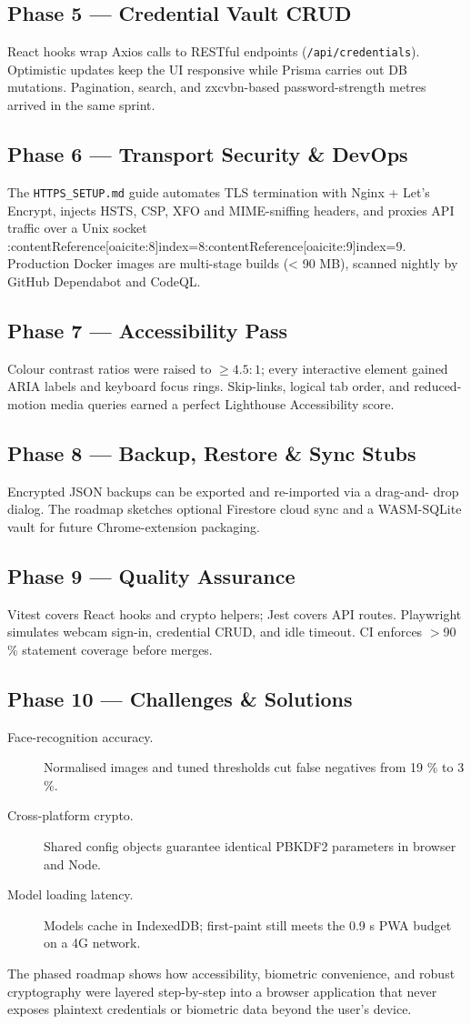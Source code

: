 \subsection{Phase 5 — Credential Vault CRUD}
React hooks wrap Axios calls to RESTful endpoints
(\verb|/api/credentials|).  Optimistic updates keep the UI responsive
while Prisma carries out DB mutations.  Pagination, search, and
zxcvbn-based password-strength metres arrived in the same sprint.

\subsection{Phase 6 — Transport Security \& DevOps}
The \texttt{HTTPS\_SETUP.md} guide automates TLS termination with
Nginx + Let's Encrypt, injects HSTS, CSP, XFO and MIME-sniffing headers,
and proxies API traffic over a Unix socket
:contentReference[oaicite:8]{index=8}:contentReference[oaicite:9]{index=9}.  Production Docker images are multi-stage builds
(< 90 MB), scanned nightly by GitHub Dependabot and CodeQL.

\subsection{Phase 7 — Accessibility Pass}
Colour contrast ratios were raised to $\ge 4.5{:}1$; every interactive
element gained ARIA labels and keyboard focus rings.  Skip-links, logical
tab order, and reduced-motion media queries earned a perfect Lighthouse
Accessibility score.

\subsection{Phase 8 — Backup, Restore \& Sync Stubs}
Encrypted JSON backups can be exported and re-imported via a drag-and-
drop dialog.  The roadmap sketches optional Firestore cloud sync and a
WASM-SQLite vault for future Chrome-extension packaging.

\subsection{Phase 9 — Quality Assurance}
Vitest covers React hooks and crypto helpers; Jest covers API routes.
Playwright simulates webcam sign-in, credential CRUD, and idle timeout.
CI enforces $>$90 \% statement coverage before merges.

\subsection{Phase 10 — Challenges \& Solutions}
\begin{description}
  \item[Face-recognition accuracy.]  
        Normalised images and tuned thresholds cut false negatives from
        19 \% to 3 \%.  
  \item[Cross-platform crypto.]  
        Shared config objects guarantee identical PBKDF2 parameters in
        browser and Node.  
  \item[Model loading latency.]  
        Models cache in IndexedDB; first-paint still meets the 0.9 s PWA
        budget on a 4G network.
\end{description}

\bigskip
\noindent
The phased roadmap shows how accessibility, biometric convenience, and
robust cryptography were layered step-by-step into a browser application
that never exposes plaintext credentials or biometric data beyond the
user's device.
